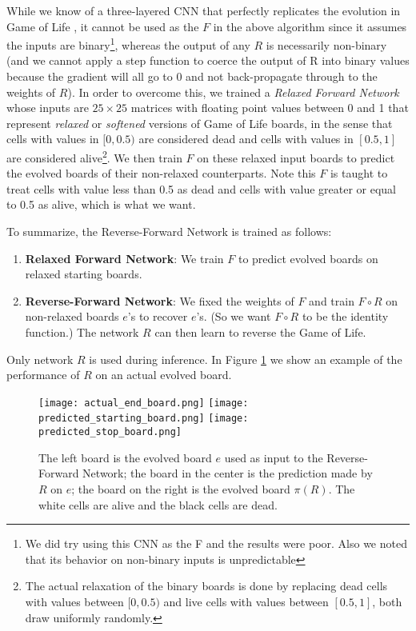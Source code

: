 \documentclass[conference]{IEEEtran}
\begin{document}
While we know of a three-layered CNN that perfectly replicates the evolution in Game of Life \cite{springer2020its}, it cannot be used as the $F$ in the above algorithm since it assumes the inputs are binary\footnote{We did try using this CNN as the F and the results were poor. Also we noted that its behavior on non-binary inputs is unpredictable}, whereas the output of any $R$ is necessarily non-binary (and we cannot apply a step function to coerce the output of R into binary values because the gradient will all go to 0 and not back-propagate through to the weights of $R$). In order to overcome this, we trained a \emph{Relaxed Forward Network} whose inputs are $25 \times 25$ matrices with floating point values between 0 and 1 that represent \emph{relaxed} or \emph{softened} versions of Game of Life boards, in the sense that cells with values in $[0, 0.5)$ are considered dead and cells with values in $[0.5, 1]$ are considered alive\footnote{The actual relaxation of the binary boards is done by replacing dead cells with values between $[0, 0.5)$ and live cells with values between $[0.5, 1]$, both draw uniformly randomly.}. We then train $F$ on these relaxed input boards to predict the evolved boards of their non-relaxed counterparts. Note this $F$ is taught to treat cells with value less than 0.5 as dead and cells with value greater or equal to 0.5 as alive, which is what we want.

To summarize, the Reverse-Forward Network is trained as follows:
\begin{enumerate}
    \item \textbf{Relaxed Forward Network}: We train $F$ to predict evolved boards on relaxed starting boards.
    \item \textbf{Reverse-Forward Network}: We fixed the weights of $F$ and train $F \circ R$ on non-relaxed boards $e$'s to recover $e$'s. (So we want $F \circ R$ to be the identity function.) The network $R$ can then learn to reverse the Game of Life.
\end{enumerate}

Only network $R$ is used during inference. In Figure \ref{fig:boards} we show an example of the performance of $R$ on an actual evolved board. 

\begin{figure}[!h]
\begin{center}
  \texttt{[image: actual\_end\_board.png]}
\endminipage\hfill
{}
  \texttt{[image: predicted\_starting\_board.png]}
\endminipage\hfill
{}%
  \texttt{[image: predicted\_stop\_board.png]}
\endminipage
\caption{The left board is the evolved board $e$ used as input to the Reverse-Forward Network; the board in the center is the prediction made by $R$ on $e$; the board on the right is the evolved board $\pi(R)$. The white cells are alive and the black cells are dead.}
\label{fig:boards}
\end{center}
\end{figure}
\end{document}
